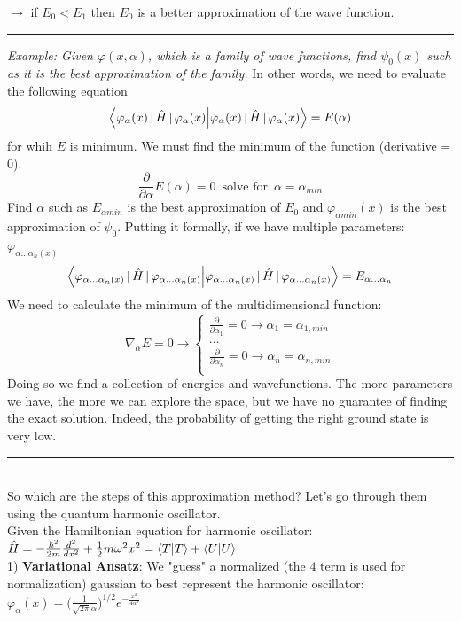 $\rightarrow$ if $E_0 < E_1$ then $E_0$ is a better approximation of the wave function.\\
\newline
\noindent\rule{4cm}{0.1pt}
\newline
\textit{Example: Given $\varphi(x, \alpha)$, which is a family of wave functions, find $\psi_0(x)$ such as it is the best approximation of the family.} In other words, we need to evaluate the following equation\\
\[
\braket{\varphi_{\alpha}(x)\,|\,\hat{H}\,|\,\varphi_{\alpha}(x)}=E(\alpha)
\]
for whih $E$ is minimum.
We must find the minimum of the function (derivative = 0).
\[
\frac{\partial}{\partial\alpha}E(\alpha)=0\, \text{  solve for  }\, \alpha=\alpha_{min}
\]
Find $\alpha$ such as $E_{\alpha min}$ is the best approximation of $E_0$ and $\varphi_{\alpha min}(x)$ is the best approximation of $\psi_0$.
Putting it formally, if we have multiple parameters: $\varphi_{\alpha \dots \alpha_n(x)}$
\[
\braket{\varphi_{\alpha \dots \alpha_n(x)}\,|\,\hat{H}\,|\,\varphi_{\alpha \dots \alpha_n(x)}} = E_{\alpha \dots \alpha_n}
\]
We need to calculate the minimum of the multidimensional function:
\[
\nabla_{\alpha}E=0 \rightarrow
\begin{cases}
\frac{\partial}{\partial \alpha_1}=0 \rightarrow \alpha_1=\alpha_{1, min}\\
\dots\\
\frac{\partial}{\partial \alpha_n}=0 \rightarrow \alpha_n= \alpha_{n, min}\\
\end{cases}
\]
Doing so we find a collection of energies and wavefunctions.
The more parameters we have, the more we can explore the space, but  we have no guarantee of finding the exact solution.
Indeed, the probability of getting the right ground state is very low.
\newline
\noindent\rule{4cm}{0.1pt}
\newline
\\
So which are the steps of this approximation method? Let's go through them using the quantum harmonic oscillator.\\

Given the Hamiltonian equation for harmonic oscillator: $\hat{H}=-\frac{\hbar^2}{2m}\frac{d^2}{dx^2}+\frac{1}{2}m\omega^2x^2=\braket{T}+\braket{U}$\\
1) \textbf{Variational Ansatz}: We "guess" a normalized (the $4$ term is used for normalization) gaussian to best represent the harmonic oscillator: $\varphi_{\alpha}(x)=\bigg(\frac{1}{\sqrt{2\pi}\alpha}\bigg)^{1/2}e^{-{\frac{x^2}{4\alpha^2}}}$\\

